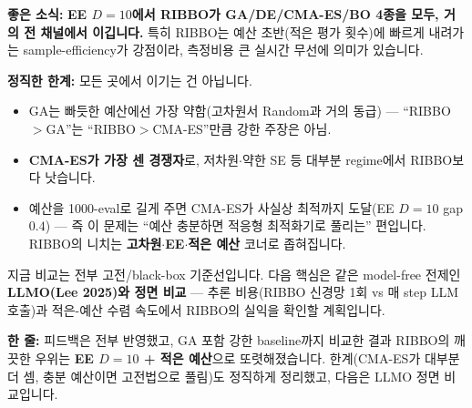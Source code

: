 \documentclass[12pt]{article}
\newcommand{\fsec}[1]{\vspace{8pt}\noindent{\color{hdr}\bfseries\large #1}\par\vspace{3pt}}
\begin{document}
\vspace{4pt}
{\color{acc}\bfseries 좋은 소식:} \textbf{EE $D{=}10$에서 RIBBO가 GA/DE/CMA-ES/BO 4종을 모두, 거의 전 채널에서 이깁니다.} 특히 RIBBO는 예산 초반(적은 평가 횟수)에 빠르게 내려가는 sample-efficiency가 강점이라, 측정비용 큰 실시간 무선에 의미가 있습니다.

\vspace{2pt}
{\color{flag}\bfseries 정직한 한계:} 모든 곳에서 이기는 건 아닙니다.
\begin{itemize}[leftmargin=1.4em,itemsep=1.5pt,topsep=2pt]
    \item GA는 빠듯한 예산에선 가장 약함(고차원서 Random과 거의 동급) --- ``RIBBO$>$GA''는 ``RIBBO$>$CMA-ES''만큼 강한 주장은 아님.
    \item \textbf{CMA-ES가 가장 센 경쟁자}로, 저차원$\cdot$약한 SE 등 대부분 regime에서 RIBBO보다 낫습니다.
    \item 예산을 1000-eval로 길게 주면 CMA-ES가 사실상 최적까지 도달(EE $D{=}10$ gap $0.4$) --- 즉 이 문제는 ``예산 충분하면 적응형 최적화기로 풀리는'' 편입니다. RIBBO의 니치는 \textbf{고차원$\cdot$EE$\cdot$적은 예산} 코너로 좁혀집니다.
\end{itemize}

\fsec{3. 다음 단계}
지금 비교는 전부 고전/black-box 기준선입니다. 다음 핵심은 같은 model-free 전제인 \textbf{LLMO(Lee 2025)와 정면 비교} --- 추론 비용(RIBBO 신경망 1회 vs 매 step LLM 호출)과 적은-예산 수렴 속도에서 RIBBO의 실익을 확인할 계획입니다.

\vspace{8pt}
\noindent\colorbox{black!8}{\parbox{\dimexpr\linewidth-2\fboxsep}{%
\textbf{한 줄:} 피드백은 전부 반영했고, GA 포함 강한 baseline까지 비교한 결과 RIBBO의 깨끗한 우위는 \textbf{EE $D{=}10$ + 적은 예산}으로 또렷해졌습니다. 한계(CMA-ES가 대부분 더 셈, 충분 예산이면 고전법으로 풀림)도 정직하게 정리했고, 다음은 LLMO 정면 비교입니다.}}
\end{document}
